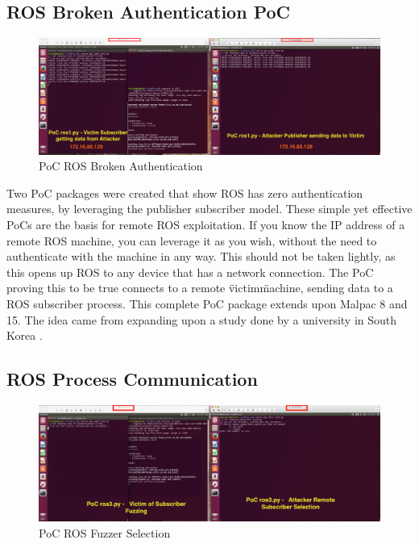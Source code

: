\documentclass[IEEEtran,letterpaper,10pt,notitlepage,draftclsnofoot]{article}
\begin{document}
\subsection{ROS Broken Authentication PoC}
\begin{figure}[H]
  \centering
    \includegraphics[width=\textwidth]{poc1}
    \caption{PoC ROS Broken Authentication}
\end{figure}

Two PoC packages were created that show ROS has zero authentication measures, by leveraging the publisher subscriber model.
These simple yet effective PoCs are the basis for remote ROS exploitation. If you know the IP address of a remote ROS machine, you can leverage it as you wish, without the need
to authenticate with the machine in any way. This should not be taken lightly, as this opens up ROS to any device that has a network connection. The PoC proving this to be true
connects to a remote \"victim\" machine, sending data to a ROS subscriber process. This complete PoC package extends upon Malpac 8 and 15. The idea came from expanding upon a study done by a university in South Korea \cite{ROSVulnCounter}.

\subsection{ROS Process Communication}
\begin{figure}[H]
  \centering
    \includegraphics[width=\textwidth]{poc2}
    \caption{PoC ROS Fuzzer Selection}
\end{figure}
\end{document}
